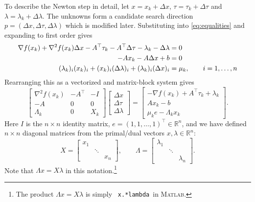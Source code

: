 \documentclass[11pt]{article}
\newcommand{\RR}{\mathbb{R}}
\newcommand{\grad}{\nabla}
\newcommand{\Matlab}{\textsc{Matlab}\xspace}
\begin{document}
To describe the Newton step in detail, let $x=x_k+\Delta x$, $\tau=\tau_k+\Delta\tau$ and $\lambda=\lambda_k+\Delta\lambda$.  The unknowns form a candidate search direction $p=(\Delta x,\Delta\tau,\Delta\lambda)$ which is modified later.  Substituting into \eqref{eq:equalities} and expanding to first order gives
\begin{align}
\grad f(x_k) + \grad^2 f(x_k) \Delta x - A^\top \tau_k - A^\top \Delta \tau - \lambda_k - \Delta \lambda &= 0 \label{eq:prenewtonstep} \\
-A x_k - A \Delta x + b &= 0 \notag \\
(\lambda_k)_i (x_k)_i + (x_k)_i (\Delta\lambda)_i + (\lambda_k)_i (\Delta x)_i &= \mu_k, \qquad i=1,\dots,n \notag
\end{align}
Rearranging this as a vectorized and matrix-block system gives
\begin{equation}
\begin{bmatrix}
\grad^2 f(x_k) & -A^\top & -I \\
-A             & 0       & 0  \\
\Lambda_k      & 0       & X_k
\end{bmatrix}
\begin{bmatrix}
\Delta x \\
\Delta \tau \\
\Delta \lambda
\end{bmatrix}
=
\begin{bmatrix}
-\grad f(x_k) + A^\top \tau_k + \lambda_k \\
A x_k - b \\
\mu_k e - \Lambda_k x_k
\end{bmatrix}. \label{eq:newtonstep}
\end{equation}
Here $I$ is the $n\times n$ identity matrix, $e=(1,1,\dots,1)^\top \in \RR^n$, and we have defined $n\times n$ diagonal matrices from the primal/dual vectors $x,\lambda\in\RR^n$:
    $$X = \begin{bmatrix} x_1 & & \\ & \ddots & \\ & & x_n \end{bmatrix}, \qquad \Lambda = \begin{bmatrix} \lambda_1 & & \\ & \ddots & \\ & & \lambda_n \end{bmatrix}.$$
Note that $\Lambda x = X \lambda$ in this notation.\footnote{The product $\Lambda x = X\lambda$ is simply \, \texttt{x.*lambda}\, in \Matlab.}
\end{document}
